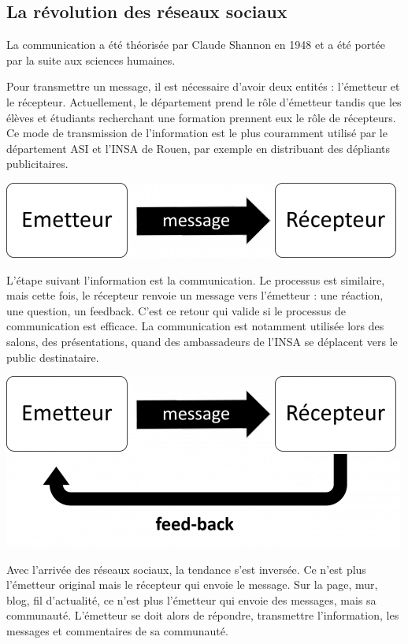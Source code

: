 \subsection{La révolution des réseaux sociaux}
La communication a été théorisée par Claude Shannon en 1948 et a été portée par la suite aux sciences humaines.

Pour transmettre un message, il est nécessaire d'avoir deux entités : l'émetteur et le récepteur. Actuellement, le département 
prend le rôle d'émetteur tandis que les élèves et étudiants recherchant une formation prennent eux le rôle de récepteurs. Ce mode 
de transmission de l'information est le plus couramment utilisé par le département ASI et l'INSA de Rouen, par exemple en distribuant 
des dépliants publicitaires.

\begin{center}
\includegraphics[scale=0.5]{./image/information.png}
\end{center}

L'étape suivant l'information est la communication. Le processus est similaire, mais cette fois, le récepteur renvoie un message 
vers l'émetteur : une réaction, une question, un feedback. C'est ce retour qui valide si le processus de communication est efficace. 
La communication est notamment utilisée lors des salons, des présentations, quand des ambassadeurs de l'INSA se déplacent vers le public destinataire.

\begin{center}
\includegraphics[scale=0.5]{./image/communication.png}
\end{center}

Avec l'arrivée des réseaux sociaux, la tendance s'est inversée. Ce n'est plus l'émetteur original mais le récepteur qui envoie le message. 
Sur la page, mur, blog, fil d'actualité, ce n'est plus l'émetteur qui envoie des messages, mais sa communauté. L'émetteur se doit alors de 
répondre, transmettre l'information, les messages et commentaires de sa communauté.

